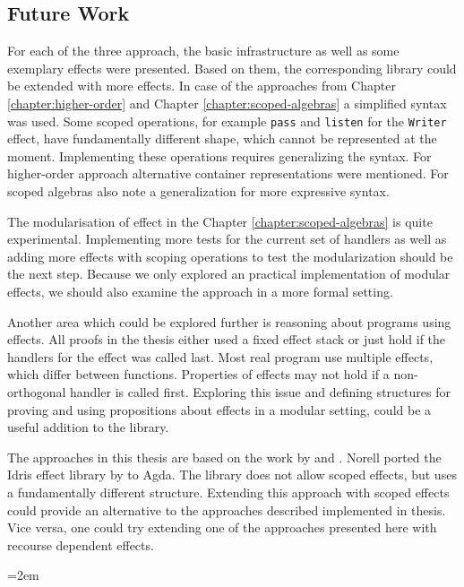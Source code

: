 \documentclass[10pt,a4paper,twoside,notitlepage]{report}
\begin{document}
\subsection{Future Work}

For each of the three approach, the basic infrastructure as well as some
exemplary effects were presented.
Based on them, the corresponding library could be extended with more effects.
In case of the approaches from Chapter \ref{chapter:higher-order} and Chapter
\ref{chapter:scoped-algebras} a simplified syntax was used.
Some scoped operations, for example \texttt{pass} and \texttt{listen} for the
\texttt{Writer} effect, have fundamentally different shape, which cannot be
represented at the moment.
Implementing these operations requires generalizing the syntax.
For higher-order approach alternative container representations were mentioned.
For scoped algebras \textcite{DBLP:conf/lics/PirogSWJ18} also note a
generalization for more expressive syntax.

The modularisation of effect in the Chapter \ref{chapter:scoped-algebras} is
quite experimental.
Implementing more tests for the current set of handlers as well as adding more
effects with scoping operations to test the modularization should be the next
step.
Because we only explored an practical implementation of modular effects, we
should also examine the approach in a more formal setting.

Another area which could be explored further is reasoning about programs using
effects.
All proofs in the thesis either used a fixed effect stack or just hold if the
handlers for the effect was called last.
Most real program use multiple effects, which differ between functions.
Properties of effects may not hold if a non-orthogonal handler is called first.
Exploring this issue and defining structures for proving and using propositions
about effects in a modular setting, could be a useful addition to the library.

The approaches in this thesis are based on the work by
\textcite{DBLP:conf/haskell/WuSH14} and \textcite{DBLP:conf/lics/PirogSWJ18}.
Norell ported the Idris effect library by \textcite{DBLP:conf/icfp/Brady13} to
Agda.
The library does not allow scoped effects, but uses a fundamentally different
structure.
Extending this approach with scoped effects could provide an alternative to the
approaches described implemented in thesis.
Vice versa, one could try extending one of the approaches presented here with
recourse dependent effects.

\emergencystretch=2em
\printbibliography
\end{document}
